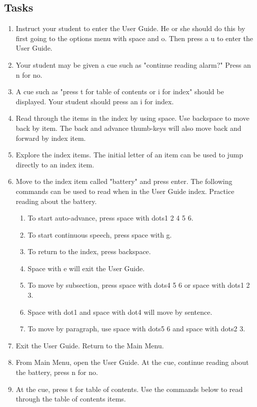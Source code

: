 \documentclass[10pt,letterpaper,twoside]{report}
\begin{document}
{{{\subsection{Tasks}
\begin{enumerate}
	\item Instruct your student to enter the User Guide.  He or she should do this by first going to the options menu with space and o.  Then press a u to enter the User Guide.
	\item Your student may be given a cue such as "continue reading alarm?" Press an n for no.
	\item A cue such as "press t for table of contents or i for index" should be displayed.  Your student should press an i for index.
	\item Read through the items in the index by using space.  Use backspace to move back by item.  The back and advance thumb-keys will also move back and forward by index item.
	\item Explore the index items.  The initial letter of an item can be used to jump directly to an index item.
	\item Move to the index item called "battery" and press enter.  The following commands can be used to read when in the User Guide index.  Practice reading about the battery.
	      \begin{enumerate}
		      \item To start auto-advance, press space with dots1 2 4 5 6.
		      \item To start continuous speech, press space with g.
		      \item To return to the index, press backspace.
		      \item Space with e will exit the User Guide.
		      \item To move by subsection, press space with dots4 5 6 or space with dots1 2 3.
		      \item Space with dot1 and space with dot4 will move by sentence.
		      \item To move by paragraph, use space with dots5 6 and space with dots2 3.
	      \end{enumerate}
	\item Exit the User Guide.  Return to the Main Menu.
	\item From Main Menu, open the User Guide.  At the cue, continue reading about the battery, press n for no.
	\item At the cue, press t for table of contents.  Use the commands below to read through the table of contents items.

\end{enumerate}}}}
\end{document}
